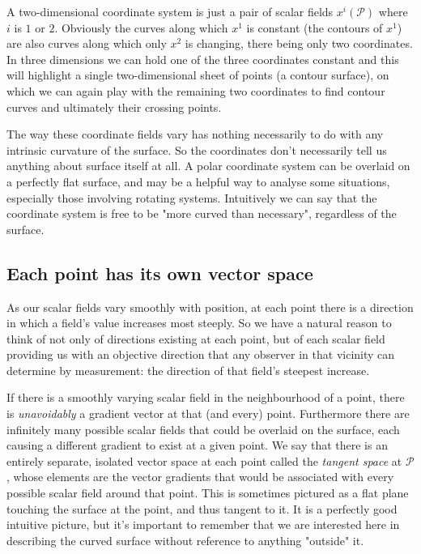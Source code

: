 A two-dimensional coordinate system is just a pair of scalar fields $x^i(\mathcal{P})$ where $i$ is $1$ or $2$. Obviously the curves along which $x^1$ is constant (the contours of $x^1$) are also curves along which only $x^2$ is changing, there being only two coordinates. In three dimensions we can hold one of the three coordinates constant and this will highlight a single two-dimensional sheet of points (a contour surface), on which we can again play with the remaining two coordinates to find contour curves and ultimately their crossing points.

The way these coordinate fields vary has nothing necessarily to do with any intrinsic curvature of the surface. So the coordinates don't necessarily tell us anything about surface itself at all. A polar coordinate system can be overlaid on a perfectly flat surface, and may be a helpful way to analyse some situations, especially those involving rotating systems. Intuitively we can say that the coordinate system is free to be "more curved than necessary", regardless of the surface.

\subsection{Each point has its own vector space}

As our scalar fields vary smoothly with position, at each point there is a direction in which a field's value increases most steeply. So we have a natural reason to think of not only of directions existing at each point, but of each scalar field providing us with an objective direction that any observer in that vicinity can determine by measurement: the direction of that field's steepest increase. 

If there is a smoothly varying scalar field in the neighbourhood of a point, there is \textit{unavoidably} a gradient vector at that (and every) point. Furthermore there are infinitely many possible scalar fields that could be overlaid on the surface, each causing a different gradient to exist at a given point. We say that there is an entirely separate, isolated vector space at each point called the \textit{tangent space} at $\mathcal{P}$, whose elements are the vector gradients that would be associated with every possible scalar field around that point. This is sometimes pictured as a flat plane touching the surface at the point, and thus tangent to it. It is a perfectly good intuitive picture, but it's important to remember that we are interested here in describing the curved surface without reference to anything "outside" it.

